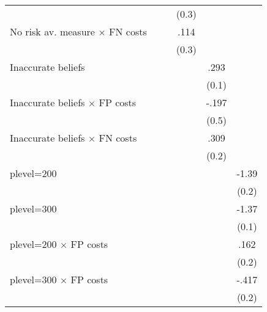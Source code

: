 \begin{table}[htbp]
\begin{tabular}{l*{5}{c}}
                &                  &                  &    (0.3)         &                  &                  \\
No risk av. measure $\times$ FN costs&                  &                  &     .114         &                  &                  \\
                &                  &                  &    (0.3)         &                  &                  \\
Inaccurate beliefs&                  &                  &                  &     .293\sym{**} &                  \\
                &                  &                  &                  &    (0.1)         &                  \\
Inaccurate beliefs $\times$ FP costs&                  &                  &                  &    -.197         &                  \\
                &                  &                  &                  &    (0.5)         &                  \\
Inaccurate beliefs $\times$ FN costs&                  &                  &                  &     .309         &                  \\
                &                  &                  &                  &    (0.2)         &                  \\
plevel=200      &                  &                  &                  &                  &    -1.39\sym{***}\\
                &                  &                  &                  &                  &    (0.2)         \\
plevel=300      &                  &                  &                  &                  &    -1.37\sym{***}\\
                &                  &                  &                  &                  &    (0.1)         \\
plevel=200 $\times$ FP costs&                  &                  &                  &                  &     .162         \\
                &                  &                  &                  &                  &    (0.2)         \\
plevel=300 $\times$ FP costs&                  &                  &                  &                  &    -.417\sym{***}\\
                &                  &                  &                  &                  &    (0.2)         \\

\end{tabular}
\end{table}

